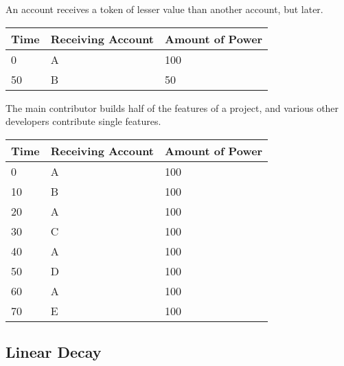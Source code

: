 \begin{scenario}
  \label{sce:less_power_later}
  An account receives a token of lesser value than another account, but later.

  \begin{center}
    \begin{tabular}{lll}
      \toprule
        \textbf{Time} & \textbf{Receiving Account} & \textbf{Amount of Power}\\
      \midrule
        0 & A & 100\\
        50 & B & 50\\
      \bottomrule
    \end{tabular}
  \end{center}
\end{scenario}

\begin{scenario}
  \label{sce:main_contributor}
  The main contributor builds half of the features of a project, and various other developers contribute single features.

  \begin{center}
    \begin{tabular}{lll}
      \toprule
        \textbf{Time} & \textbf{Receiving Account} & \textbf{Amount of Power}\\
      \midrule
        0 & A & 100\\
        10 & B & 100\\
        20 & A & 100\\
        30 & C & 100\\
        40 & A & 100\\
        50 & D & 100\\
        60 & A & 100\\
        70 & E & 100\\
      \bottomrule
    \end{tabular}
  \end{center}
\end{scenario}

\subsection{Linear Decay}

